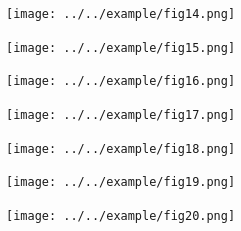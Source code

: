 \documentclass[a4paper,12pt]{article}
\begin{document}
\begin{figure}[p]
\begin{center}
\texttt{[image: ../../example/fig14.png]}
\end{center}
\end{figure}

\begin{figure}[p]
\begin{center}
\texttt{[image: ../../example/fig15.png]}
\end{center}
\end{figure}

\begin{figure}[p]
\begin{center}
\texttt{[image: ../../example/fig16.png]}
\end{center}
\end{figure}

\FloatBarrier

\begin{figure}[p]
\begin{center}
\texttt{[image: ../../example/fig17.png]}
\end{center}
\end{figure}

\begin{figure}[p]
\begin{center}
\texttt{[image: ../../example/fig18.png]}
\end{center}
\end{figure}

\FloatBarrier

\begin{figure}[p]
\begin{center}
\texttt{[image: ../../example/fig19.png]}
\end{center}
\end{figure}

\begin{figure}[p]
\begin{center}
\texttt{[image: ../../example/fig20.png]}
\end{center}
\end{figure}
\end{document}
